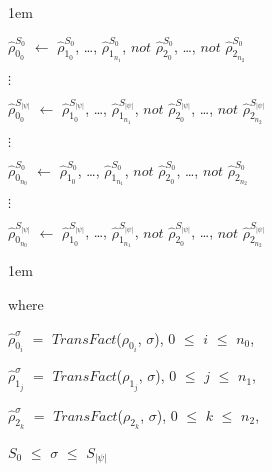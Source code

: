 \documentclass[11pt]{report}
\newenvironment{vquote}
{
  \begin{list}{}{\leftmargin 1em}\item[]
}
{
  \end{list}
}
\begin{document}
            \begin{vquote}
              $\hat{\rho}^{S_{0}}_{0_{0}}$ $\leftarrow$
                $\hat{\rho}^{S_{0}}_{1_{0}}$, \ldots,
                  $\hat{\rho}^{S_{0}}_{1_{n_1}}$,
                $not$ $\hat{\rho}^{S_{0}}_{2_{0}}$, \ldots,
                  $not$ $\hat{\rho}^{S_{0}}_{2_{n_2}}$

              $\vdots$

              $\hat{\rho}^{S_{|\psi|}}_{0_{0}}$ $\leftarrow$
                $\hat{\rho}^{S_{|\psi|}}_{1_{0}}$, \ldots,
                  $\hat{\rho}^{S_{|\psi|}}_{1_{n_1}}$,
                $not$ $\hat{\rho}^{S_{|\psi|}}_{2_{0}}$, \ldots,
                  $not$ $\hat{\rho}^{S_{|\psi|}}_{2_{n_2}}$

              $\vdots$

              $\hat{\rho}^{S_{0}}_{0_{n_0}}$ $\leftarrow$
                $\hat{\rho}^{S_{0}}_{1_{0}}$, \ldots,
                  $\hat{\rho}^{S_{0}}_{1_{n_1}}$,
                $not$ $\hat{\rho}^{S_{0}}_{2_{0}}$, \ldots,
                  $not$ $\hat{\rho}^{S_{0}}_{2_{n_2}}$

              $\vdots$

              $\hat{\rho}^{S_{|\psi|}}_{0_{n_0}}$ $\leftarrow$
                $\hat{\rho}^{S_{|\psi|}}_{1_{0}}$, \ldots,
                  $\hat{\rho}^{S_{|\psi|}}_{1_{n_1}}$,
                $not$ $\hat{\rho}^{S_{|\psi|}}_{2_{0}}$, \ldots,
                  $not$ $\hat{\rho}^{S_{|\psi|}}_{2_{n_2}}$
            \end{vquote}

            \begin{vquote}
              where

              \hspace{1em}
              $\hat{\rho}^{\sigma}_{0_i}$ $=$
                $TransFact$($\rho_{0_i}$, $\sigma$), $0$ $\leq$ $i$ $\leq$ $n_0$,

              \hspace{1em}
              $\hat{\rho}^{\sigma}_{1_j}$ $=$
                $TransFact$($\rho_{1_j}$, $\sigma$), $0$ $\leq$ $j$ $\leq$ $n_1$,

              \hspace{1em}
              $\hat{\rho}^{\sigma}_{2_k}$ $=$
                $TransFact$($\rho_{2_k}$, $\sigma$), $0$ $\leq$ $k$ $\leq$ $n_2$,

              \hspace{1em}
              $S_{0}$ $\leq$ $\sigma$ $\leq$ $S_{|\psi|}$
            \end{vquote}
\end{document}

